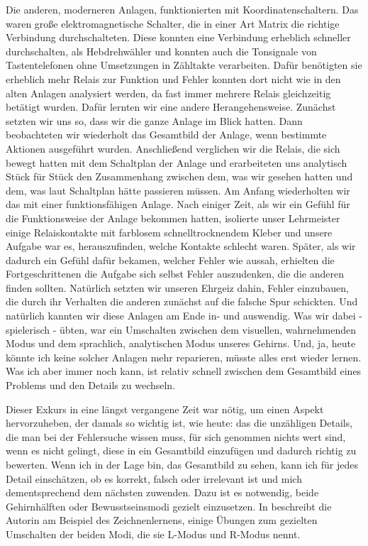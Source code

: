 \begin{normaltext}
  Die anderen, moderneren Anlagen, funktionierten mit Koordinatenschaltern.
  Das waren große elektromagnetische Schalter, die in einer Art Matrix die
  richtige Verbindung durchschalteten. Diese konnten eine Verbindung erheblich
  schneller durchschalten, als Hebdrehwähler und konnten auch die Tonsignale
  von Tastentelefonen ohne Umsetzungen in Zähltakte verarbeiten. Dafür
  benötigten sie erheblich mehr Relais zur Funktion und Fehler konnten dort
  nicht wie in den alten Anlagen analysiert werden, da fast immer mehrere
  Relais gleichzeitig betätigt wurden. Dafür lernten wir eine andere
  Herangehensweise. Zunächst setzten wir uns so, dass wir die ganze Anlage im
  Blick hatten. Dann beobachteten wir wiederholt das Gesamtbild der Anlage,
  wenn bestimmte Aktionen ausgeführt wurden. Anschließend verglichen wir die
  Relais, die sich bewegt hatten mit dem Schaltplan der Anlage und
  erarbeiteten uns analytisch Stück für Stück den Zusammenhang zwischen dem,
  was wir gesehen hatten und dem, was laut Schaltplan hätte passieren müssen.
  Am Anfang wiederholten wir das mit einer funktionsfähigen Anlage. Nach
  einiger Zeit, als wir ein Gefühl für die Funktionsweise der Anlage bekommen
  hatten, isolierte unser Lehrmeister einige Relaiskontakte mit farblosem
  schnelltrocknendem Kleber und unsere Aufgabe war es, herauszufinden, welche
  Kontakte schlecht waren. Später, als wir dadurch ein Gefühl dafür bekamen,
  welcher Fehler wie aussah, erhielten die Fortgeschrittenen die Aufgabe sich
  selbst Fehler auszudenken, die die anderen finden sollten. Natürlich setzten
  wir unseren Ehrgeiz dahin, Fehler einzubauen, die durch ihr Verhalten die
  anderen zunächst auf die falsche Spur schickten. Und natürlich kannten wir
  diese Anlagen am Ende in- und auswendig. Was wir dabei - spielerisch -
  übten, war ein Umschalten zwischen dem visuellen, wahrnehmenden Modus und
  dem sprachlich, analytischen Modus unseres Gehirns. Und, ja, heute könnte
  ich keine solcher Anlagen mehr reparieren, müsste alles erst wieder lernen.
  Was ich aber immer noch kann, ist relativ schnell zwischen dem Gesamtbild
  eines Problems und den Details zu wechseln.

  Dieser Exkurs in eine längst vergangene Zeit war nötig, um einen Aspekt
  hervorzuheben, der damals so wichtig ist, wie heute: das die unzähligen
  Details, die man bei der Fehlersuche wissen muss, für sich genommen nichts
  wert sind, wenn es nicht gelingt, diese in ein Gesamtbild einzufügen und
  dadurch richtig zu bewerten. Wenn ich in der Lage bin, das Gesamtbild zu
  sehen, kann ich für jedes Detail einschätzen, ob es korrekt, falsch oder
  irrelevant ist und mich dementsprechend dem nächsten zuwenden.
  Dazu ist es notwendig, beide Gehirnhälften oder Bewusstseinsmodi gezielt
  einzusetzen. In \cite{edwards:zeichnenlernen} beschreibt die Autorin am
  Beispiel des Zeichnenlernens, einige Übungen zum gezielten Umschalten der
  beiden Modi, die sie L-Modus und R-Modus nennt.
\end{normaltext}

